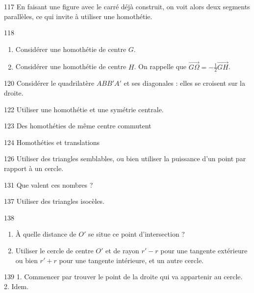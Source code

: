 \begin{Hint}{117}
En faisant  une figure avec le carré déjà construit, on voit alors deux segments parallèles, ce qui invite à utiliser  une homothétie.
\end{Hint}
\begin{Hint}{118}
\begin{enumerate}
\item Considérer une homothétie de centre $G$.
\item Considérer une homothétie de centre $H$. On rappelle que $\overrightarrow{G\Omega}=-\frac12\overrightarrow{GH}$.
\end{enumerate}
\end{Hint}
\begin{Hint}{120}
Considérer le quadrilatère $ABB'A'$ et ses diagonales : elles se croisent sur la droite.
\end{Hint}
\begin{Hint}{122}
    Utiliser une homothétie et une symétrie centrale.
\end{Hint}
\begin{Hint}{123}
    Des homothéties de même centre commutent
\end{Hint}
\begin{Hint}{124}
Homothéties et translations
\end{Hint}
\begin{Hint}{126}
Utiliser des triangles semblables, ou bien utiliser la puissance d'un point par rapport à un cercle.
\end{Hint}
\begin{Hint}{131}
Que valent ces nombres ?
\end{Hint}
\begin{Hint}{137}
Utiliser des triangles isocèles.
\end{Hint}
\begin{Hint}{138}
\begin{enumerate}
\item À quelle distance de $O'$ se situe ce point d'intersection ?
\item Utiliser  le cercle de centre $O'$ et de rayon $r'-r$ pour une tangente \og extérieure\fg{} ou bien $r'+r$ pour une  tangente \og intérieure\fg, et un autre cercle.
\end{enumerate}
\end{Hint}
\begin{Hint}{139}
1. Commencer par trouver le point de la droite qui va appartenir au cercle.\\

2. Idem.
\end{Hint}
